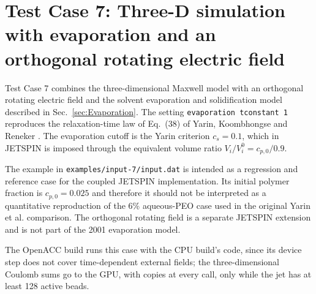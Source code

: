 \section{Test Case 7: Three-D simulation with evaporation and an orthogonal rotating electric field}

Test Case 7 combines the three-dimensional Maxwell model with an
orthogonal rotating electric field and the solvent evaporation and
solidification model described in Sec.~\ref{sec:Evaporation}. The
setting \texttt{evaporation tconstant 1} reproduces the relaxation-time
law of Eq.~(38) of Yarin, Koombhongse and Reneker
\cite{yarin2001bending}. The evaporation cutoff is the Yarin criterion
$c_s=0.1$, which in JETSPIN is imposed through the equivalent volume
ratio $V_i/V_i^0=c_{p,0}/0.9$.

The example in \texttt{examples/input-7/input.dat} is intended as a
regression and reference case for the coupled JETSPIN implementation.
Its initial polymer fraction is $c_{p,0}=0.025$ and therefore it should
not be interpreted as a quantitative reproduction of the 6\% aqueous-PEO
case used in the original Yarin et al. comparison. The orthogonal rotating
field is a separate JETSPIN extension and is not part of the 2001
evaporation model.

The OpenACC build runs this case with the CPU build's code, since its device
step does not cover time-dependent external fields; the three-dimensional
Coulomb sums go to the GPU, with copies at every call, only while the jet
has at least 128 active beads.
